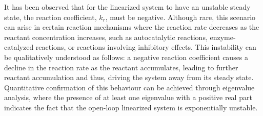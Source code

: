 It has been observed that for the linearized system to have an unstable steady state, the reaction coefficient, $k_r$, must be negative. Although rare, this scenario can arise in certain reaction mechanisms where the reaction rate decreases as the reactant concentration increases, such as autocatalytic reactions, enzyme-catalyzed reactions, or reactions involving inhibitory effects. This instability can be qualitatively understood as follows: a negative reaction coefficient causes a decline in the reaction rate as the reactant accumulates, leading to further reactant accumulation and thus, driving the system away from its steady state. Quantitative confirmation of this behaviour can be achieved through eigenvalue analysis, where the presence of at least one eigenvalue with a positive real part indicates the fact that the open-loop linearized system is exponentially unstable.
